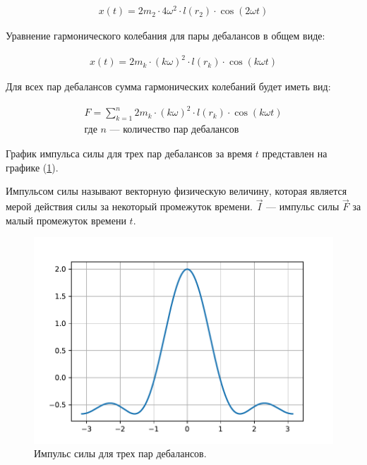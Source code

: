 \begin{equation*}
    \begin{aligned}
        x(t) = 2 m_2 \cdot 4 \omega^2 \cdot l(r_2) \cdot \cos (2 \omega t)
    \end{aligned}
\end{equation*}

Уравнение гармонического колебания для пары дебалансов в общем виде:

\begin{equation}\label{eq:harmonic_common}
    \begin{aligned}
        x(t) = 2 m_k \cdot (k \omega)^2 \cdot l(r_k) \cdot \cos (k \omega t)
    \end{aligned}
\end{equation}

Для всех пар дебалансов сумма гармонических колебаний будет иметь вид:

\begin{equation}\label{eq:harmonic_sum}
    \begin{gathered}
        F = \sum\limits_{k = 1}^n 2 m_k \cdot (k \omega)^2 \cdot l(r_k) \cdot \cos (k \omega t) \\
        \textrm{где $n$ --- количество пар дебалансов} 
    \end{gathered}
\end{equation}

График импульса силы для трех пар дебалансов за время $t$ представлен на графике (\ref{grap:impulse_3}).

\begin{definition}
    Импульсом силы называют векторную физическую величину, которая является мерой действия силы за некоторый промежуток времени. $\vec{I}$ --- импульс силы $\vec{F}$ за малый промежуток времени $t$.
\end{definition}

\begin{figure}[h]
    \centering
    \includegraphics[width=1\linewidth]{grap/impulse_3.pdf}
    \caption{Импульс силы для трех пар дебалансов.}
    \label{grap:impulse_3}
\end{figure}

